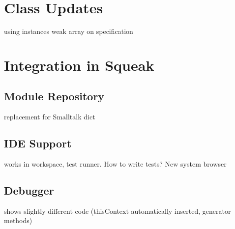 \section{Class Updates}
using instances weak array on specification

\section{Integration in Squeak}

\subsection{Module Repository}
replacement for Smalltalk dict

\subsection{IDE Support}
works in workspace, test runner. How to write tests? New system browser

\subsection{Debugger}
shows slightly different code (thisContext automatically inserted, generator methods)